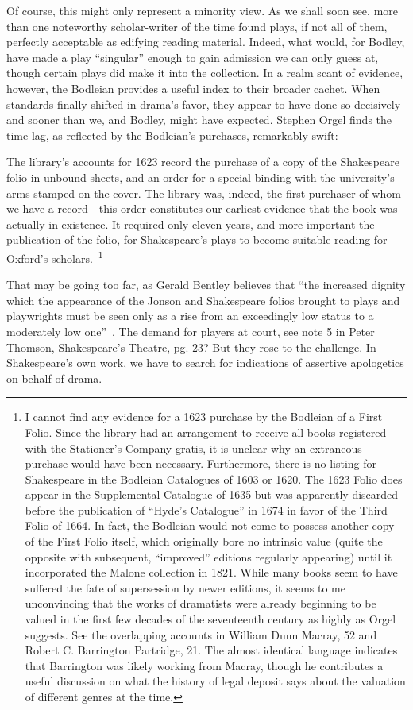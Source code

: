 Of course, this might only represent a minority view. As we shall soon see, more than one noteworthy scholar-writer of the time found plays, if not all of them, perfectly acceptable as edifying reading material. Indeed, what would, for Bodley, have made a play ``singular'' enough to gain admission we can only guess at, though certain plays did make it into the collection. In a realm scant of evidence, however, the Bodleian provides a useful index to their broader cachet. When standards finally shifted in drama's favor, they appear to have done so decisively and sooner than we, and Bodley, might have expected. Stephen Orgel finds the time lag, as reflected by the Bodleian's purchases, remarkably swift:
\begin{bq}
The library's accounts for 1623 record the purchase of a copy of the Shakespeare folio in unbound sheets, and an order for a special binding with the university's arms stamped on the cover. The library was, indeed, the first purchaser of whom we have a record---this order constitutes our earliest evidence that the book was actually in existence. It required only eleven years, and more important the publication of the folio, for Shakespeare's plays to become suitable reading for Oxford's scholars.~\cite[5]{orgel_authentic_1988}\footnote{I cannot find any evidence for a 1623 purchase by the Bodleian of a First Folio. Since the library had an arrangement to receive all books registered with the Stationer's Company gratis, it is unclear why an extraneous purchase would have been necessary. Furthermore, there is no listing for Shakespeare in the Bodleian Catalogues of 1603 or 1620. The 1623 Folio does appear in the Supplemental Catalogue of 1635 but was apparently discarded before the publication of ``Hyde's Catalogue'' in 1674 in favor of the Third Folio of 1664. In fact, the Bodleian would not come to possess another copy of the First Folio itself, which originally bore no intrinsic value (quite the opposite with subsequent, ``improved'' editions regularly appearing) until it incorporated the Malone collection in 1821. While many books seem to have suffered the fate of supersession by newer editions, it seems to me unconvincing that the works of dramatists were already beginning to be valued in the first few decades of the seventeenth century as highly as Orgel suggests. See the overlapping accounts in William Dunn Macray, 52\nocite{macray_annals_1890} and Robert C. Barrington Partridge, 21.\nocite{partridge_history_1938} The almost identical language indicates that Barrington was likely working from Macray, though he contributes a useful discussion on what the history of legal deposit says about the valuation of different genres at the time.}
\end{bq}
That may be going too far, as Gerald Bentley believes that ``the increased dignity which the appearance of the Jonson and Shakespeare folios brought to plays and playwrights must be seen only as a rise from an exceedingly low status to a moderately low one''~\cite[57]{bentley_profession_1984}.
The demand for players at court, see note 5 in Peter Thomson, Shakespeare's Theatre, pg. 23? But they rose to the challenge. In Shakespeare's own work, we have to search for indications of assertive apologetics on behalf of drama.

